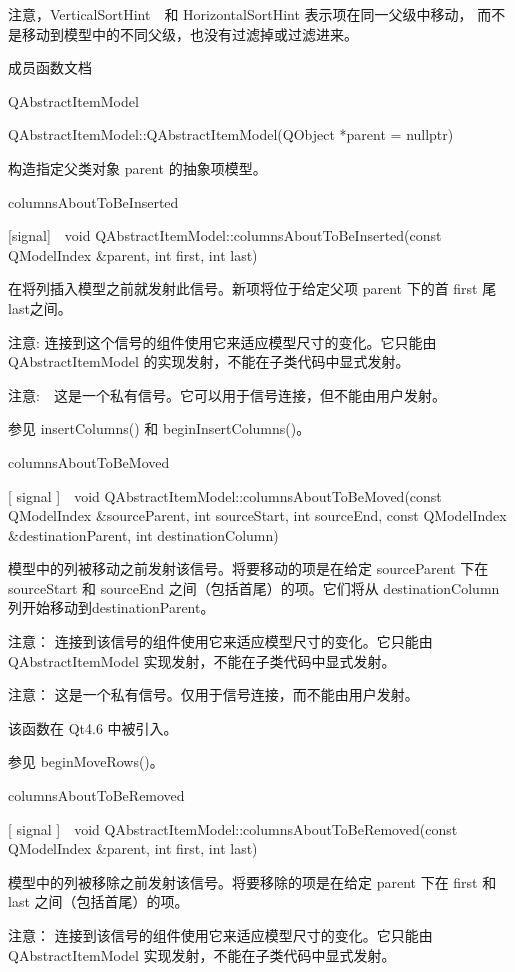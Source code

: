 注意，VerticalSortHint　和 HorizontalSortHint 表示项在同一父级中移动，
而不是移动到模型中的不同父级，也没有过滤掉或过滤进来。

\splitLine

成员函数文档

QAbstractItemModel

QAbstractItemModel::QAbstractItemModel(QObject *parent = nullptr)

构造指定父类对象 parent 的抽象项模型。

columnsAboutToBeInserted

[signal] void QAbstractItemModel::columnsAboutToBeInserted(const QModelIndex \&parent, int first, int last)

在将列插入模型之前就发射此信号。新项将位于给定父项 parent 下的首 first 尾 last之间。

注意: 连接到这个信号的组件使用它来适应模型尺寸的变化。它只能由 QAbstractItemModel 的实现发射，不能在子类代码中显式发射。

注意:　这是一个私有信号。它可以用于信号连接，但不能由用户发射。

参见 insertColumns() 和 beginInsertColumns()。

columnsAboutToBeMoved

[ signal ] void QAbstractItemModel::columnsAboutToBeMoved(const QModelIndex \&sourceParent, int sourceStart, int sourceEnd, const QModelIndex \&destinationParent, int destinationColumn)

模型中的列被移动之前发射该信号。将要移动的项是在给定 sourceParent 下在 sourceStart 和 sourceEnd 之间（包括首尾）的项。它们将从 destinationColumn 列开始移动到destinationParent。

注意： 连接到该信号的组件使用它来适应模型尺寸的变化。它只能由 QAbstractItemModel 实现发射，不能在子类代码中显式发射。

注意： 这是一个私有信号。仅用于信号连接，而不能由用户发射。

该函数在 Qt4.6 中被引入。

参见 beginMoveRows()。

columnsAboutToBeRemoved

[ signal ] void QAbstractItemModel::columnsAboutToBeRemoved(const QModelIndex \&parent, int first, int last)

模型中的列被移除之前发射该信号。将要移除的项是在给定 parent 下在 first 和 last 之间（包括首尾）的项。

注意： 连接到该信号的组件使用它来适应模型尺寸的变化。它只能由 QAbstractItemModel 实现发射，不能在子类代码中显式发射。


